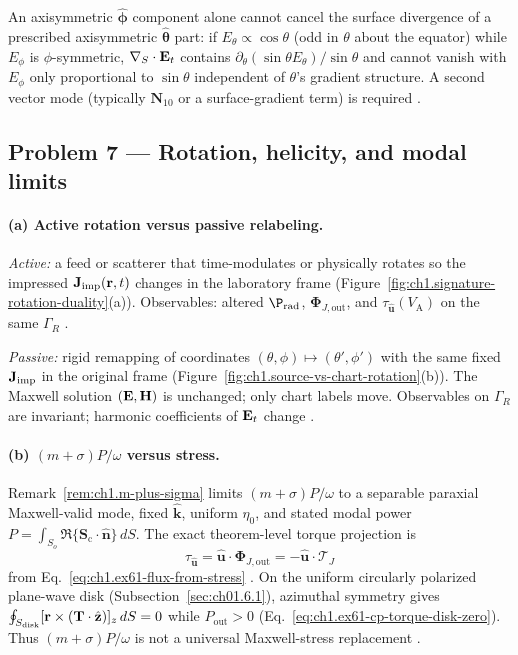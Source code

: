 An axisymmetric $\hat{\boldsymbol\phi}$ component alone cannot cancel the surface divergence of a prescribed axisymmetric $\hat{\boldsymbol\theta}$ part: if $E_\theta\propto\cos\theta$ (odd in $\theta$ about the equator) while $E_\phi$ is $\phi$-symmetric, $\nabla_S\cdot\mathbf{E}_t$ contains $\partial_\theta(\sin\theta E_\theta)/\sin\theta$ and cannot vanish with $E_\phi$ only proportional to $\sin\theta$ independent of $\theta$'s gradient structure. A second vector mode (typically $\mathbf{N}_{10}$ or a surface-gradient term) is required \cite{stratton1941,hansen1988}.

\subsection*{Problem 7 --- Rotation, helicity, and modal limits}

\paragraph{(a) Active rotation versus passive relabeling.}
\textit{Active:} a feed or scatterer that time-modulates or physically rotates so the impressed $\mathbf{J}_{\mathrm{imp}}(\mathbf{r},t)$ changes in the laboratory frame (Figure~\ref{fig:ch1.signature-rotation-duality}(a)). Observables: altered $\P_{\mathrm{rad}}$, $\boldsymbol{\Phi}_{J,\mathrm{out}}$, and $\tau_{\hat{\mathbf{u}}}(V_{\mathrm{A}})$ on the same $\Gamma_R$ \cite{beth1936,stratton1941}.

\textit{Passive:} rigid remapping of coordinates $(\theta,\phi)\mapsto(\theta',\phi')$ with the same fixed $\mathbf{J}_{\mathrm{imp}}$ in the original frame (Figure~\ref{fig:ch1.source-vs-chart-rotation}(b)). The Maxwell solution $(\mathbf{E},\mathbf{H})$ is unchanged; only chart labels move. Observables on $\Gamma_R$ are invariant; harmonic coefficients of $\mathbf{E}_t$ change \cite{hansen1988,stratton1941}.

\paragraph{(b) $(m+\sigma)P/\omega$ versus stress.}
Remark~\ref{rem:ch1.m-plus-sigma} limits $(m+\sigma)P/\omega$ to a separable paraxial Maxwell-valid mode, fixed $\hat{\mathbf{k}}$, uniform $\eta_0$, and stated modal power $P=\int_{S_o}\Re\{\mathbf{S}_\mathrm{c}\cdot\hat{\mathbf{n}}\}\,dS$. The exact theorem-level torque projection is
\[
\tau_{\hat{\mathbf{u}}}=\hat{\mathbf{u}}\cdot\boldsymbol{\Phi}_{J,\mathrm{out}}
=-\hat{\mathbf{u}}\cdot\boldsymbol{\mathcal{T}}_J
\]
from Eq.~\eqref{eq:ch1.ex61-flux-from-stress} \cite{stratton1941,beth1936}. On the uniform circularly polarized plane-wave disk (Subsection~\ref{sec:ch01.6.1}), azimuthal symmetry gives $\oint_{S_{\mathrm{disk}}}[\mathbf{r}\times(\mathbf{T}\cdot\hat{\mathbf{z}})]_z\,dS=0$ while $P_{\mathrm{out}}>0$ (Eq.~\eqref{eq:ch1.ex61-cp-torque-disk-zero}). Thus $(m+\sigma)P/\omega$ is not a universal Maxwell-stress replacement \cite{stratton1941,beth1936}.

